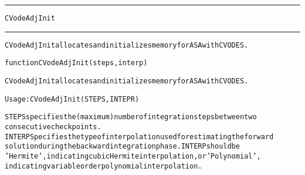 \begin{samepage}
\hrule
\begin{center}
{\large \verb!CVodeAdjInit!}
\label{p:CVodeAdjInit}
\end{center}
\hrule\vspace{0.1in}



\begin{alltt}
CVodeAdjInit allocates and initializes memory for ASA with CVODES.
\end{alltt}

\end{samepage}



\begin{samepage}


\begin{alltt}
function CVodeAdjInit(steps, interp) 
\end{alltt}

\end{samepage}



\begin{alltt}
CVodeAdjInit allocates and initializes memory for ASA with CVODES.

   Usage: CVodeAdjInit(STEPS, INTEPR) 

   STEPS    specifies the (maximum) number of integration steps between two 
            consecutive check points.
   INTERP   Specifies the type of interpolation used for estimating the forward 
            solution during the backward integration phase. INTERP should be
            'Hermite', indicating cubic Hermite interpolation, or 'Polynomial',
            indicating variable order polynomial interpolation.
\end{alltt}






\vspace{0.1in}